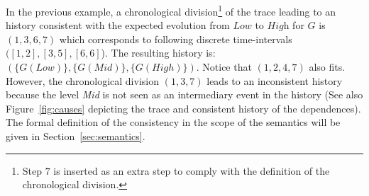\documentclass{eptcs}
\newcounter{ti}
\begin{document}
 In the previous example, a chronological division\footnote{Step $7$ is inserted as an extra step to comply with the definition of the chronological division.} of the trace leading to an history consistent with the expected evolution from $\textit{Low}$ to $\textit{High}$ for $G$ is $(1,3,6,7)$ which corresponds to following discrete time-intervals $([1,2],[3,5],[6,6]$).
The resulting history is: $\scriptstyle (\{ G(Low) \},\{G(Mid)\},\{G(High)\})$. Notice that $(1,2,4,7)$ also fits. However, the chronological division $(1,3,7)$ leads to an inconsistent history because the level \textit{Mid} is not seen as an intermediary event in the history (See also Figure~\ref{fig:causes} depicting the trace and consistent history of the dependences). The formal definition of the consistency in the scope of the semantics will be given in Section~\ref{sec:semantics}.
\end{document}
